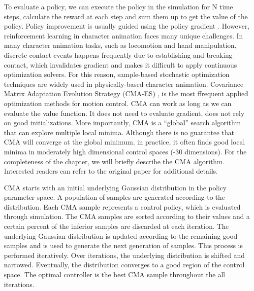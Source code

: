 To evaluate a policy, we can execute the policy in the simulation for N time steps, calculate the reward at each step and sum them up to get the value of the policy. Policy improvement is usually guided using the policy gradient \cite{Ng:2000:PPS}. However, reinforcement learning in character animation faces many unique challenges. In many character animation tasks, such as locomotion and hand manipulation, discrete contact events happens frequently due to establishing and breaking contact, which invalidates gradient and makes it difficult to apply continuous optimization solvers. For this reason, sample-based stochastic optimization techniques are widely used in physically-based character animation. Covariance Matrix Adaptation Evolution Strategy (CMA-ES) \cite{hansen2006cma}, is the most ffrequent applied optimization methods for motion control. CMA can work as long as we can evaluate the value function. It does not need to evaluate gradient, does not rely on good initializations. More importantly, CMA is a ``global'' search algorithm that can explore multiple local minima. Although there is no guarantee that CMA will converge at the global minimum, in practice, it often finds good local minima in moderately high dimensional control spaces (-30 dimensions). For the completeness of the chapter, we will briefly describe the CMA algorithm. Interested readers can refer to the original paper \cite{hansen2006cma} for additional details.

CMA starts with an initial underlying Gaussian distribution in the policy parameter space. A population of samples are generated according to the distribution. Each CMA sample represents a control policy, which is evaluated through simulation. The CMA samples are sorted according to their values and a certain percent of the inferior samples are discarded at each iteration. The underlying Gaussian distribution is updated according to the remaining good samples and is used to generate the next generation of samples. This process is performed iteratively. Over iterations, the underlying distribution is shifted and narrowed. Eventually,  the distribution converges to a good region of the control space. The optimal controller is the  best CMA sample throughout the all iterations.

